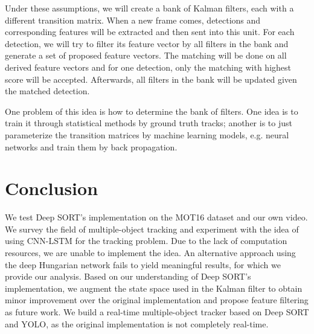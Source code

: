\documentclass[conference]{IEEEtran}
\begin{document}
Under these assumptions, we will create a bank of Kalman filters, each with a different transition matrix. When a new frame comes, detections and corresponding features will be extracted and then sent into this unit. For each detection, we will try to filter its feature vector by all filters in the bank and generate a set of proposed feature vectors. The matching will be done on all derived feature vectors and for one detection, only the matching with highest score will be accepted. Afterwards, all filters in the bank will be updated given the matched detection.

One problem of this idea is how to determine the bank of filters. One idea is to train it through statistical methods by ground truth tracks; another is to just parameterize the transition matrices by machine learning models, e.g. neural networks and train them by back propagation. 

\section{Conclusion}

We test Deep SORT's implementation on the MOT16 dataset and our own video. We survey the field of multiple-object tracking and experiment with the idea of using CNN-LSTM for the tracking problem. Due to the lack of computation resources, we are unable to implement the idea. An alternative approach using the deep Hungarian network fails to yield meaningful results, for which we provide our analysis. Based on our understanding of Deep SORT's implementation, we augment the state space used in the Kalman filter to obtain minor improvement over the original implementation and propose feature filtering as future work. We build a real-time multiple-object tracker based on Deep SORT and YOLO, as the original implementation is not completely real-time.



\end{document}
